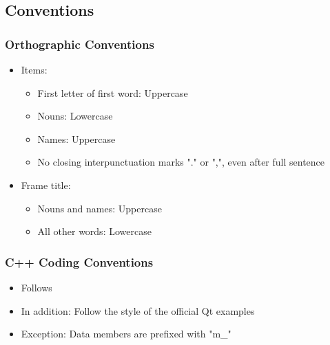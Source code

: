 \subsection{Conventions}

\begin{slide}
  \frametitle{Orthographic Conventions}
  \begin{itemize}
    \item Items:
    \begin{itemize}
      \item First letter of first word: Uppercase
      \item Nouns: Lowercase
      \item Names: Uppercase
      \item No closing interpunctuation marks "." or ",", even after full sentence
    \end{itemize}
    \item Frame title:
    \begin{itemize}
      \item Nouns and names: Uppercase
      \item All other words: Lowercase
    \end{itemize}
  \end{itemize}
\end{slide}

\begin{slide}
  \frametitle{C++ Coding Conventions}
  \begin{itemize}
    \item Follows 
    \item In addition: Follow the style of the official Qt examples
    \item Exception: Data members are prefixed with "m\_"
  \end{itemize}
\end{slide}
